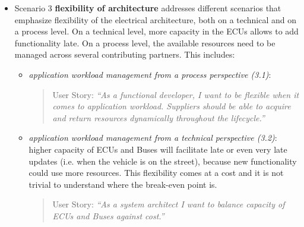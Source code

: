\begin{itemize}
\begin{itemize}

\item {\em The danger of architecture and design  evolving in different directions (2.2)}: If not actively managed,  architecture and design diverge over time. 
The architecture is then perceived as outdated and not useful, thus it looses its ability to guide design decisions and implementation.

\begin{quote}
{User Story:} 
\emph{``As a system architect or function developer I want a stringent correlation between architecture and design. Otherwise, one or the other is wrong.''}
\end{quote}
\end{itemize}

\item Scenario 3 {\bf flexibility of architecture} addresses different scenarios that emphasize flexibility of the electrical architecture, both on a technical and on a process level. On a technical level, more capacity in the ECUs allows to add functionality late. 
On a process level, the available resources need to be managed across several contributing partners.
This includes:

\begin{itemize}
\item {\em application workload management from a process perspective (3.1)}: 
\begin{quote}
{User Story:} 
\emph{``As a functional developer, I want to be flexible when it comes to application workload. 
Suppliers should be able to acquire and return resources dynamically throughout the lifecycle.''}
\end{quote}
\item {\em application workload management from a technical perspective (3.2)}: higher capacity of ECUs and Buses will facilitate late or even very late updates (i.e. when the vehicle is on the street), because new functionality could use more resources.
This flexibility comes at a cost and it is not trivial to understand where the break-even point is.

\begin{quote}
{User Story:} 
\emph{``As a system architect I want to balance capacity of ECUs and Buses against cost.''}
\end{quote}


\end{itemize}
\end{itemize}
